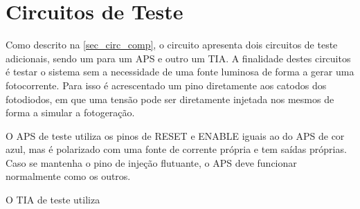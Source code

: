\section{Circuitos de Teste}
\label{BlocoTestes}

Como descrito na \autoref{sec_circ_comp}, o circuito apresenta dois circuitos de teste adicionais, sendo um para um APS e outro um TIA. A finalidade destes circuitos \'e testar o sistema sem a necessidade de uma fonte luminosa de forma a gerar uma fotocorrente. Para isso \'e acrescentado um pino diretamente aos catodos dos fotodiodos, em que uma tens\~ao pode ser diretamente injetada nos mesmos de forma a simular a fotogera{\c c}\~ao.

O APS de teste utiliza os pinos de RESET e ENABLE iguais ao do APS de cor azul, mas \'e polarizado com uma fonte de corrente pr\'opria e tem sa\'idas pr\'oprias. Caso se mantenha o pino de inje{\c c}\~ao flutuante, o APS deve funcionar normalmente como os outros.

O TIA de teste utiliza